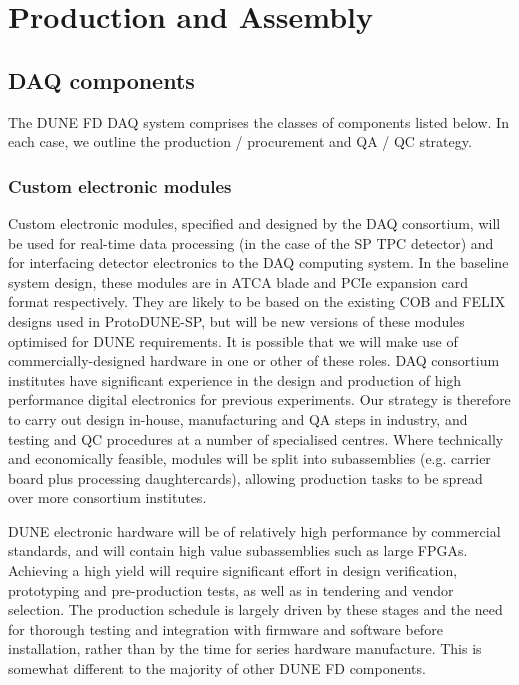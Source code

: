 
\section{Production and Assembly}
\label{sec:fd-daq-prod-assy}

\subsection{DAQ components}

The DUNE FD DAQ system comprises the classes of components listed below. In each case, we outline the production / procurement and QA / QC strategy.

\subsubsection{Custom electronic modules}

Custom electronic modules, specified and designed by the DAQ consortium, will be used for real-time data processing (in the case of the SP TPC detector) and for interfacing detector electronics to the DAQ computing system. In the baseline system design, these modules are in ATCA blade and PCIe expansion card format respectively. They are likely to be based on the existing COB and FELIX designs used in ProtoDUNE-SP, but will be new versions of these modules optimised for DUNE requirements. It is possible that we will make use of commercially-designed hardware in one or other of these roles. DAQ consortium institutes have significant experience in the design and production of high performance digital electronics for previous experiments. Our strategy is therefore to carry out design in-house, manufacturing and QA steps in industry, and testing and QC procedures at a number of specialised centres. Where technically and economically feasible, modules will be split into subassemblies (e.g. carrier board plus processing daughtercards), allowing production tasks to be spread over more consortium institutes.

DUNE electronic hardware will be of relatively high performance by commercial standards, and will contain high value subassemblies such as large FPGAs. Achieving a high yield will require significant effort in design verification, prototyping and pre-production tests, as well as in tendering and vendor selection. The production schedule is largely driven by these stages and the need for thorough testing and integration with firmware and software before installation, rather than by the time for series hardware manufacture. This is somewhat different to the majority of other DUNE FD components.

